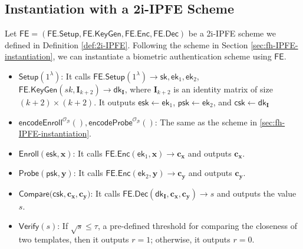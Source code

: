 \fi


\iffalse

\subsection{Instantiation with a 2i-IPFE Scheme}
\label{sec:2i-IPFE-instantiation}

Let $\textsf{FE} = (\textsf{FE.Setup}, \textsf{FE.KeyGen}, \textsf{FE.Enc}, \textsf{FE.Dec})$ be a 2i-IPFE scheme we defined in Definition \ref{def:2i-IPFE}. Following the scheme in Section \ref{sec:fh-IPFE-instantiation}, we can instantiate a biometric authentication scheme using $\textsf{FE}$.

\begin{itemize}

	\item $\textsf{Setup}(1^\lambda)$: It calls $\textsf{FE.Setup}(1^\lambda) \to \textsf{sk}, \textsf{ek}_1, \textsf{ek}_2$, $ \textsf{FE.KeyGen}(sk, \mathbf{I}_{k+2}) \to \textsf{dk}_{\mathbf{I}} $, where $\mathbf{I}_{k+2}$ is an identity matrix of size $(k+2) \times (k+2)$. It outputs $\textsf{esk} \gets \textsf{ek}_1$, $\textsf{psk} \gets \textsf{ek}_2$, and $\textsf{csk} \gets \textsf{dk}_{\mathbf{I}}$

	\item $\textsf{encodeEnroll}^{\mathcal{O}_{\mathcal{B}}}(), \textsf{encodeProbe}^{\mathcal{O}_{\mathcal{B}}}()$: The same as the scheme in \ref{sec:fh-IPFE-instantiation}. 

	\item $\textsf{Enroll}(\textsf{esk}, \mathbf{x})$: It calls $\textsf{FE.Enc}(\textsf{ek}_1, \mathbf{x}) \to \mathbf{c_x}$ and outputs $\mathbf{c_x}$.

	\item $\textsf{Probe}(\textsf{psk}, \mathbf{y})$: It calls $\textsf{FE.Enc}(\textsf{ek}_2, \mathbf{y}) \to \mathbf{c_y}$ and outputs $\mathbf{c_y}$.

	\item $\textsf{Compare}(\textsf{csk}, \mathbf{c_x}, \mathbf{c_y)}$: It calls $\textsf{FE.Dec}(\textsf{dk}_{\mathbf{I}}, \mathbf{c_x}, \mathbf{c_y}) \to s$ and outputs the value $s$.

	\item $\textsf{Verify}(s)$: If $\sqrt{s} \leq \tau$, a pre-defined threshold for comparing the closeness of two templates, then it outputs $r = 1$; otherwise, it outputs $r = 0$.

\end{itemize}

